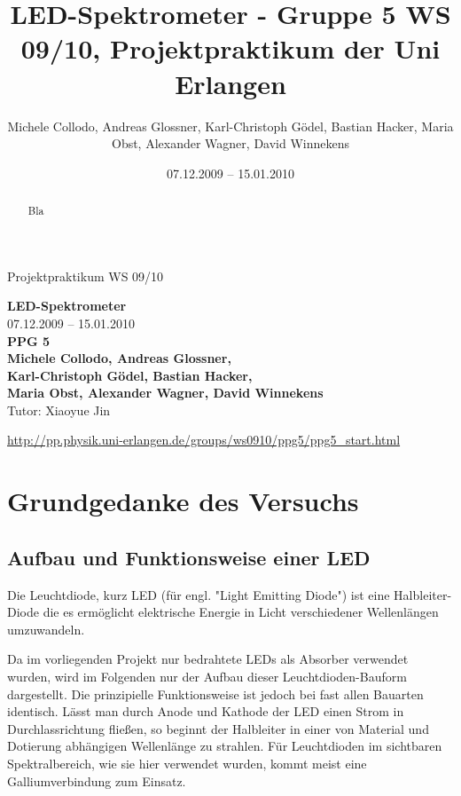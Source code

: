 \documentclass[11pt]{scrartcl}
\title{LED-Spektrometer - Gruppe 5 WS 09/10, Projektpraktikum der Uni Erlangen}
\date{07.12.2009 -- 15.01.2010}
\author{Michele Collodo, Andreas Glossner, Karl-Christoph G\"odel, Bastian Hacker, Maria Obst, Alexander Wagner, David Winnekens}
\begin{document}
\sloppy %
\thispagestyle{empty}
\large{Projektpraktikum WS 09/10}
\hfill
{}
\\[8\baselineskip]
\begin{center}
{\fontsize{36}{54}\textbf{LED-Spektrometer}}
\\[2\baselineskip]
{\Large 07.12.2009 -- 15.01.2010}
\\[7\baselineskip]
{\huge\textbf{PPG 5}}
\\[0.5\baselineskip]
{\large\textbf{
Michele Collodo,
Andreas Glossner,\\
Karl-Christoph G\"odel,
Bastian Hacker,\\
Maria Obst,
Alexander Wagner,
David Winnekens}\\
Tutor: Xiaoyue Jin}
\vfill



\small{\url{http://pp.physik.uni-erlangen.de/groups/ws0910/ppg5/ppg5\_start.html}}
\end{center}
\newpage



\tableofcontents
\vfill



\begin{abstract}
Bla
\end{abstract}
\newpage


\section{Grundgedanke des Versuchs}

\subsection{Aufbau und Funktionsweise einer LED}
Die Leuchtdiode, kurz LED (für engl. "Light Emitting Diode") ist eine Halbleiter-Diode die es ermöglicht elektrische Energie in Licht verschiedener Wellenlängen umzuwandeln.

Da im vorliegenden Projekt nur bedrahtete LEDs als Absorber verwendet wurden, wird im Folgenden nur der Aufbau dieser Leuchtdioden-Bauform dargestellt. Die prinzipielle Funktionsweise ist jedoch bei fast allen Bauarten identisch. Lässt man durch Anode und Kathode der LED einen Strom in Durchlassrichtung fließen, so beginnt der Halbleiter in einer von Material und Dotierung abhängigen Wellenlänge zu strahlen. Für Leuchtdioden im sichtbaren Spektralbereich, wie sie hier verwendet wurden, kommt meist eine Galliumverbindung zum Einsatz.
\end{document}
